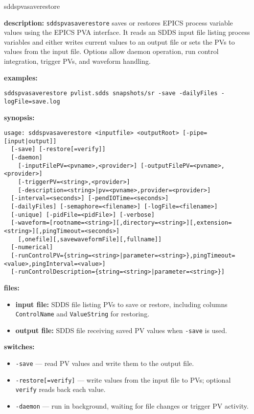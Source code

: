 \begin{sddsprog}{sddspvasaverestore}
\item \textbf{description:}
  \verb+sddspvasaverestore+ saves or restores EPICS process variable values using the EPICS PVA
  interface. It reads an SDDS input file listing process variables and either writes current
  values to an output file or sets the PVs to values from the input file. Options allow daemon
  operation, run control integration, trigger PVs, and waveform handling.
\item \textbf{examples:}
\begin{verbatim}
sddspvasaverestore pvlist.sdds snapshots/sr -save -dailyFiles -logFile=save.log
\end{verbatim}
\item \textbf{synopsis:}
\begin{verbatim}
usage: sddspvasaverestore <inputfile> <outputRoot> [-pipe=[input|output]]
  [-save] [-restore[=verify]]
  [-daemon]
    [-inputFilePV=<pvname>,<provider>] [-outputFilePV=<pvname>,<provider>]
    [-triggerPV=<string>,<provider>]
    [-description=<string>|pv=<pvname>,provider=<provider>]
  [-interval=<seconds>] [-pendIOTime=<seconds>]
  [-dailyFiles] [-semaphore=<filename>] [-logFile=<filename>]
  [-unique] [-pidFile=<pidFile>] [-verbose]
  [-waveform=[rootname=<string>][,directory=<string>][,extension=<string>][,pingTimeout=<seconds>]
    [,onefile][,savewaveformFile][,fullname]]
  [-numerical]
  [-runControlPV={string=<string>|parameter=<string>},pingTimeout=<value>,pingInterval=<value>]
  [-runControlDescription={string=<string>|parameter=<string>}]
\end{verbatim}
\item \textbf{files:}
\begin{itemize}
  \item \textbf{input file:} SDDS file listing PVs to save or restore, including columns \verb|ControlName| and \verb|ValueString| for restoring.
  \item \textbf{output file:} SDDS file receiving saved PV values when \texttt{-save} is used.
\end{itemize}
\item \textbf{switches:}
\begin{itemize}
  \item {\tt -save} --- read PV values and write them to the output file.
  \item {\tt -restore[=verify]} --- write values from the input file to PVs; optional {\tt verify} reads back each value.
  \item {\tt -daemon} --- run in background, waiting for file changes or trigger PV activity.

\end{itemize}
\end{sddsprog}
